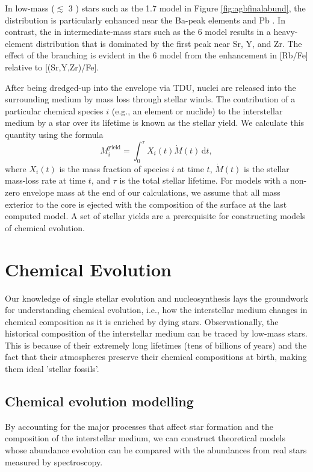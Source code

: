 In low-mass ($\lesssim$ 3 \Msun) stars such as the 1.7 \Msun model in Figure \ref{fig:agbfinalabund}, the \sprocess distribution is particularly enhanced near the Ba-peak elements and Pb \citep[as discussed in][]{Lugaro:2012ht}. In contrast, the \sprocess in intermediate-mass stars such as the 6 \Msun model results in a heavy-element distribution that is dominated by the first \sprocess peak near Sr, Y, and Zr. The effect of the \sprocess branching is evident in the 6 \Msun model from the enhancement in [Rb/Fe] relative to [(Sr,Y,Zr)/Fe].

After being dredged-up into the envelope via TDU, \sprocess nuclei are released into the surrounding medium by mass loss through stellar winds. The contribution of a particular chemical species $i$ (e.g., an element or nuclide) to the interstellar medium by a star over its lifetime is known as the stellar yield. We calculate this quantity using the formula
\begin{equation}
 M_{i}^\mathrm{yield} = \int_{0}^{\tau} X_i(t) \dot{M}(t) \,\mathrm{d}t,
\end{equation}
where $X_i(t)$ is the mass fraction of species $i$ at time $t$, $\dot{M}(t)$ is the stellar mass-loss rate at time $t$, and $\tau$ is the total stellar lifetime. For models with a non-zero envelope mass at the end of our calculations, we assume that all mass exterior to the core is ejected with the composition of the surface at the last computed model. A set of stellar yields are a prerequisite for constructing models of chemical evolution.

\section{Chemical Evolution}
Our knowledge of single stellar evolution and nucleosynthesis lays the groundwork for understanding chemical evolution, i.e., how the interstellar medium changes in chemical composition as it is enriched by dying stars. Observationally, the historical composition of the interstellar medium can be traced by low-mass stars. This is because of their extremely long lifetimes (tens of billions of years) and the fact that their atmospheres preserve their chemical compositions at birth, making them ideal 'stellar fossils'.

\subsection{Chemical evolution modelling}\label{sec:cemodelling}
By accounting for the major processes that affect star formation and the composition of the interstellar medium, we can construct theoretical models whose abundance evolution can be compared with the abundances from real stars measured by spectroscopy.

